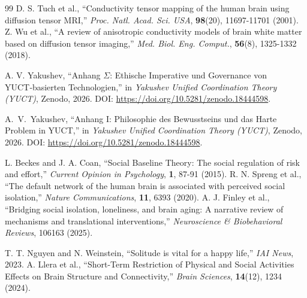 \documentclass[12pt,a4paper]{article}
\begin{document}
\begin{thebibliography}{99}
		 D. S. Tuch et al., ``Conductivity tensor mapping of the human brain using diffusion tensor MRI,'' \emph{Proc. Natl. Acad. Sci. USA}, \textbf{98}(20), 11697-11701 (2001).
		 Z. Wu et al., ``A review of anisotropic conductivity models of brain white matter based on diffusion tensor imaging,'' \emph{Med. Biol. Eng. Comput.}, \textbf{56}(8), 1325-1332 (2018).
		
		 A. V. Yakushev, ``Anhang \(\Sigma\): Ethische Imperative und Governance von YUCT‑basierten Technologien,'' in \emph{Yakushev Unified Coordination Theory (YUCT)}, Zenodo, 2026. DOI: \url{https://doi.org/10.5281/zenodo.18444598}.
		
		 A.~V.~Yakushev, ``Anhang I: Philosophie des Bewusstseins und das Harte Problem in YUCT,'' in \emph{Yakushev Unified Coordination Theory (YUCT)}, Zenodo, 2026. DOI: \url{https://doi.org/10.5281/zenodo.18444598}.
		
		 L. Beckes and J. A. Coan, ``Social Baseline Theory: The social regulation of risk and effort,'' \emph{Current Opinion in Psychology}, \textbf{1}, 87-91 (2015).
		 R. N. Spreng et al., ``The default network of the human brain is associated with perceived social isolation,'' \emph{Nature Communications}, \textbf{11}, 6393 (2020).
		 A. J. Finley et al., ``Bridging social isolation, loneliness, and brain aging: A narrative review of mechanisms and translational interventions,'' \emph{Neuroscience \& Biobehavioral Reviews}, 106163 (2025).
		
		 T. T. Nguyen and N. Weinstein, ``Solitude is vital for a happy life,'' \emph{IAI News}, 2023.
		 A. Llera et al., ``Short-Term Restriction of Physical and Social Activities Effects on Brain Structure and Connectivity,'' \emph{Brain Sciences}, \textbf{14}(12), 1234 (2024).
		
	\end{thebibliography}
	
\end{document}
